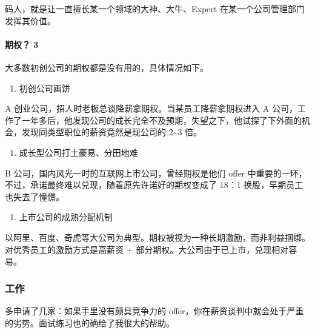 \documentclass[letterpaper,11pt,english]{sphinxmanual}
\begin{document}
码人，就是让一直擅长某一个领域的大神、大牛、Expert
在某一个公司管理部门发挥其价值。


\paragraph{期权？ 3\sphinxfootnotemark[812]}
\label{\detokenize{chapter_interview/not_go:id8}}%
\begin{footnotetext}[812]\sphinxAtStartFootnote
{}
%
\end{footnotetext}\ignorespaces 
大多数初创公司的期权都是没有用的，具体情况如下。
\begin{enumerate}
%
\item {} 
初创公司画饼

\end{enumerate}

A 创业公司，招人时老板总谈降薪拿期权。当某员工降薪拿期权进入 A
公司，工作了一年多后，他发现公司的成长完全不及预期，失望之下，他试探了下外面的机会，发现同类型职位的薪资竟然是现公司的
2\textasciitilde{}3 倍。
\begin{enumerate}
%
\setcounter{enumi}{1}
\item {} 
成长型公司打土豪易、分田地难

\end{enumerate}

B 公司，国内风光一时的互联网上市公司，曾经期权是他们 offer
中重要的一环，不过，承诺最终难以兑现，随着原先许诺好的期权变成了 18：1
换股，早期员工也失去了憧憬。
\begin{enumerate}
%
\setcounter{enumi}{2}
\item {} 
上市公司的成熟分配机制

\end{enumerate}

以阿里、百度、奇虎等大公司为典型。期权被视为一种长期激励，而非利益捆绑。对优秀员工的激励方式是高薪资
+ 部分期权。大公司由于已上市，兑现相对容易。


\subsubsection{工作}
\label{\detokenize{chapter_interview/offer:id1}}\label{\detokenize{chapter_interview/offer::doc}}
多申请了几家：如果手里没有颇具竞争力的
offer，你在薪资谈判中就会处于严重的劣势。面试练习也的确给了我很大的帮助。
\end{document}
